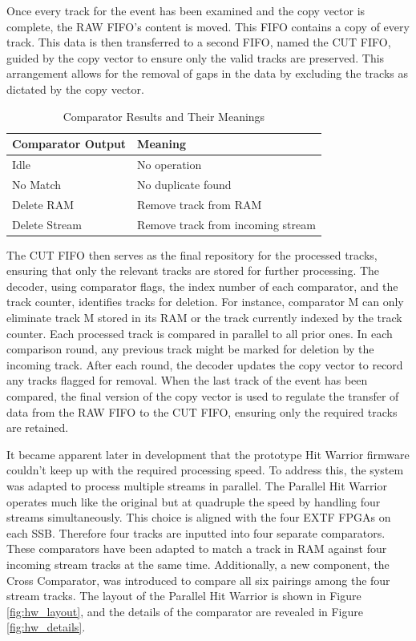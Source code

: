 Once every track for the event has been examined and the copy vector is complete, the RAW FIFO's content is moved. This FIFO contains a copy of every track. This data is then transferred to a second FIFO, named the CUT FIFO, guided by the copy vector to ensure only the valid tracks are preserved. This arrangement allows for the removal of gaps in the data by excluding the tracks as dictated by the copy vector.

\begin{table}[ht]
\centering
\begin{tabular}{ll}
\hline
\textbf{Comparator Output} & \textbf{Meaning} \\
\hline
Idle & No operation \\
No Match & No duplicate found \\
Delete RAM & Remove track from RAM \\
Delete Stream & Remove track from incoming stream \\
\hline
\end{tabular}
\caption{Comparator Results and Their Meanings}
\label{table:comparator_results}
\end{table}

The CUT FIFO then serves as the final repository for the processed tracks, ensuring that only the relevant tracks are stored for further processing.
The decoder, using comparator flags, the index number of each comparator, and the track counter, identifies tracks for deletion. For instance, comparator M can only eliminate track M stored in its RAM or the track currently indexed by the track counter. Each processed track is compared in parallel to all prior ones. In each comparison round, any previous track might be marked for deletion by the incoming track. After each round, the decoder updates the copy vector to record any tracks flagged for removal. When the last track of the event has been compared, the final version of the copy vector is used to regulate the transfer of data from the RAW FIFO to the CUT FIFO, ensuring only the required tracks are retained.

It became apparent later in development that the prototype Hit Warrior firmware couldn’t keep up with the required processing speed. To address this, the system was adapted to process multiple streams in parallel. The Parallel Hit Warrior operates much like the original but at quadruple the speed by handling four streams simultaneously. This choice is aligned with the four EXTF FPGAs on each SSB. Therefore four tracks are inputted into four separate comparators. These comparators have been adapted to match a track in RAM against four incoming stream tracks at the same time. Additionally, a new component, the Cross Comparator, was introduced to compare all six pairings among the four stream tracks.
The layout of the Parallel Hit Warrior is shown in Figure \ref{fig:hw_layout}, and the details of the comparator are revealed in Figure \ref{fig:hw_details}.

